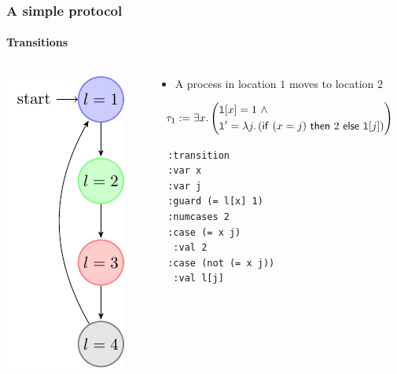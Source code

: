 \begin{frame}[fragile]
  \frametitle{A simple protocol}
  \framesubtitle{Transitions}

  \begin{columns}
  \begin{column}{0.3\textwidth}
  \centering
  \includegraphics{pictures/demo-prot1-fig}
  \end{column}
  \begin{column}{0.7\textwidth}
  
  \begin{itemize}
    \item A process in location $1$ moves to location $2$
  \end{itemize}

  \vspace{-0.5cm}

  $$
  \tau_1:= \exists x. \left(
  \begin{aligned}
  & {\tt l}[x] = 1 ~\wedge\\
  & {\tt l}' = \lambda j. \left({\sf if}~(x = j)~{\sf then}~2~{\sf else}~{\tt l}[j]\right)
  \end{aligned}
  \right)
  $$
  \pause
 {\footnotesize 
  \begin{verbatim}
  :transition
  :var x
  :var j
  :guard (= l[x] 1)
  :numcases 2
  :case (= x j)
   :val 2
  :case (not (= x j))
   :val l[j]
  \end{verbatim}
 }
\end{column}

\end{columns}  

\end{frame}

